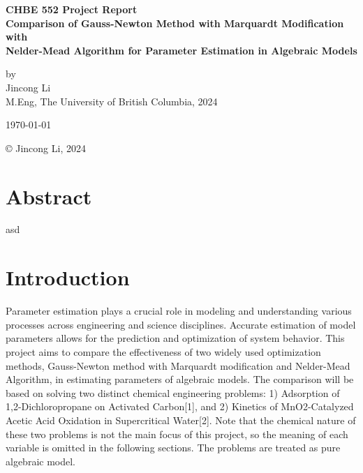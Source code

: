 \documentclass[12pt]{article} %
\begin{document}
\setlength{\parskip}{1em} 
\setlength{\parindent}{0pt}
\newcommand{\vect}[1]{\mathbf{#1}}

\begin{titlepage}  %
    \centering    %

    \vspace*{2cm}
    
    \normalsize \textbf{CHBE 552 Project Report} \\
    \vspace{0.5cm}  %
    \normalsize\textbf{Comparison of Gauss-Newton Method with Marquardt Modification with \\
     Nelder-Mead Algorithm for Parameter Estimation in Algebraic Models} \\
    \vspace{2cm}  %
    
    \normalsize by\\
    \vspace{1cm}
    \normalsize Jincong Li \\ 
    \vspace{1cm}
    \normalsize M.Eng, The University of British Columbia, 2024
    \vspace{11cm}  %
    
    \normalsize \today

    \vfill  %
    © Jincong Li, 2024
\end{titlepage}
\tableofcontents
\newpage
\section{Abstract}
asd
\section{Introduction}
Parameter estimation plays a crucial role in modeling and understanding various processes across
engineering and science disciplines. Accurate estimation of model parameters allows for the
prediction and optimization of system behavior. This project aims to compare the effectiveness
of two widely used optimization methods, Gauss-Newton method with Marquardt modification and Nelder-Mead Algorithm,
in estimating parameters of algebraic models. The comparison will be based on solving two
distinct chemical engineering problems: 1) Adsorption of 1,2-Dichloropropane on Activated
Carbon[1], and 2) Kinetics of MnO2-Catalyzed Acetic Acid Oxidation in Supercritical Water[2].
Note that the chemical nature of these two problems is not the main focus of this project, 
so the meaning of each variable is omitted in the following sections. The problems are treated
as pure algebraic model.
\end{document}
